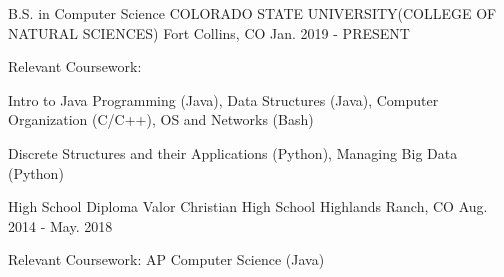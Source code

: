 

\begin{cventries}

  \cventry
    {B.S. in Computer Science} %
    {COLORADO STATE UNIVERSITY(COLLEGE OF NATURAL SCIENCES)} %
    {Fort Collins, CO} %
    {Jan. 2019 - PRESENT} %
    {
      \begin{cvitems} %
        \item {Relevant Coursework:}
        \item {Intro to Java Programming (Java), Data Structures (Java), Computer Organization (C/C++), OS and Networks (Bash)}
        \item {Discrete Structures and their Applications (Python), Managing Big Data (Python)}
      \end{cvitems}
    }


    \cventry
    {High School Diploma} %
    {Valor Christian High School} %
    {Highlands Ranch, CO} %
    {Aug. 2014 - May. 2018} %
    {
      \begin{cvitems} %
        \item {Relevant Coursework: AP Computer Science (Java)}
      \end{cvitems}
    }
\end{cventries}
